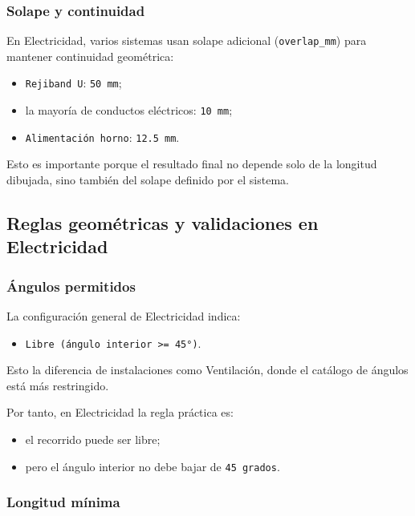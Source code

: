 \subsubsection{Solape y continuidad}

En Electricidad, varios sistemas usan solape adicional (\texttt{overlap\_mm}) para mantener continuidad geométrica:

\begin{itemize}
\item \texttt{Rejiband U}: \texttt{50 mm};
\item la mayoría de conductos eléctricos: \texttt{10 mm};
\item \texttt{Alimentación horno}: \texttt{12.5 mm}.
\end{itemize}

Esto es importante porque el resultado final no depende solo de la longitud dibujada, sino también del solape definido por el sistema.

\subsection{Reglas geométricas y validaciones en Electricidad}

\subsubsection{Ángulos permitidos}

La configuración general de Electricidad indica:

\begin{itemize}
\item \texttt{Libre (ángulo interior >= 45°)}.
\end{itemize}

Esto la diferencia de instalaciones como Ventilación, donde el catálogo de ángulos está más restringido.

Por tanto, en Electricidad la regla práctica es:

\begin{itemize}
\item el recorrido puede ser libre;
\item pero el ángulo interior no debe bajar de \texttt{45 grados}.
\end{itemize}

\subsubsection{Longitud mínima}

